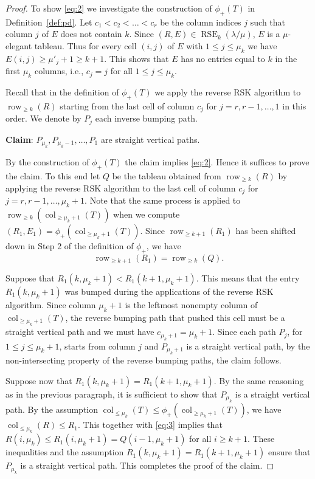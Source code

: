 \documentclass{amsart}
\numberwithin{equation}{section}
\theoremstyle{definition}
\newcommand\col{\operatorname{col}}
\newcommand\row{\operatorname{row}}
\newcommand\pd{\phi_+}
\newcommand\RSE{\operatorname{RSE}}
\newcommand\lm{{\lambda/\mu}}
\begin{document}
\begin{proof}
To show \eqref{eq:2} we investigate the construction of $\pd(T)$ in
Definition~\ref{def:pd}. Let $c_1<c_2<\dots<c_r$ be the column indices $j$ such
that column $j$ of $E$ does not contain $k$. Since $(R,E)\in\RSE_k(\lm)$, $E$ is
a $\mu$-elegant tableau. Thus for every cell $(i,j)$ of $E$ with $1\le j\le
\mu_k$ we have $E(i,j)\ge\mu'_j+1\ge k+1$. This shows that $E$ has no entries
equal to $k$ in the first $\mu_k$ columns, i.e., $c_j=j$ for all $1\le j\le
\mu_k$.

Recall that in the definition of $\pd(T)$ we apply the reverse RSK algorithm to
$\row_{\ge k}(R)$ starting from the last cell of column $c_j$ for
$j=r,r-1,\dots,1$ in this order. We denote by $P_j$ each inverse bumping path.

\textbf{Claim}: $P_{\mu_k},P_{\mu_k-1},\dots,P_1$ are straight vertical paths.

By the construction of $\pd(T)$ the claim implies \eqref{eq:2}. Hence it suffices
to prove the claim. To this end let $Q$ be the tableau obtained from $\row_{\ge
  k}(R)$ by applying the reverse RSK algorithm to the last cell of column $c_j$
for $j=r,r-1,\dots,\mu_{k}+1$. Note that the same process is applied to
$\row_{\ge k}(\col_{\ge \mu_k+1}(T))$ when we compute $(R_1,E_1)=\pd(\col_{\ge
  \mu_k+1}(T))$. Since $\row_{\ge k+1}(R_1)$ has been shifted down in Step 2 of
the definition of $\pd$, we have
\begin{equation}
  \label{eq:3}
 \row_{\ge k+1}(R_1) = \row_{\ge k}(Q). 
\end{equation}

Suppose that $R_1(k,\mu_k+1)<R_1(k+1,\mu_k+1)$. This means that the entry
$R_1(k,\mu_k+1)$ was bumped during the applications of the reverse RSK
algorithm. Since column $\mu_k+1$ is the leftmost nonempty column of $\col_{\ge
  \mu_k+1}(T)$, the reverse bumping path that pushed this cell must be a
straight vertical path and we must have $c_{\mu_k+1}=\mu_k+1$. Since each path
$P_j$, for $1\le j\le \mu_k+1$, starts from column $j$ and $P_{\mu_{k}+1}$ is a
straight vertical path, by the non-intersecting property of the reverse bumping
paths, the claim follows.

Suppose now that $R_1(k,\mu_k+1)=R_1(k+1,\mu_k+1)$. By the same reasoning as in
the previous paragraph, it is sufficient to show that $P_{\mu_k}$ is a straight
vertical path. By the assumption $\col_{\le \mu_k}(T) \le \pd(\col_{\ge
  \mu_k+1}(T))$, we have $\col_{\le \mu_k}(R)\le R_1$. This together with
\eqref{eq:3} implies that $R(i,\mu_k)\le R_1(i,\mu_k+1) = Q(i-1,\mu_k+1)$ for
all $i\ge k+1$. These inequalities and the assumption
$R_1(k,\mu_k+1)=R_1(k+1,\mu_k+1)$ ensure that $P_{\mu_k}$ is a straight vertical
path. This completes the proof of the claim.
\end{proof}
\end{document}
